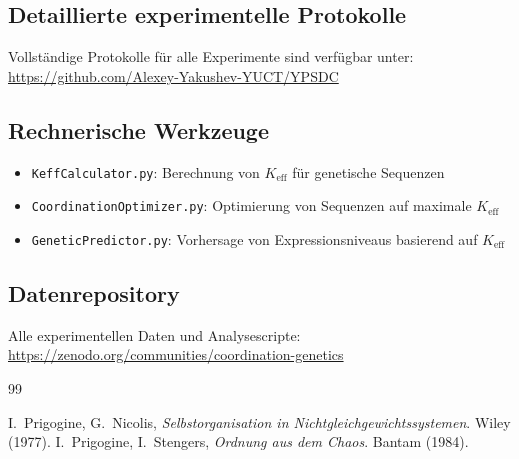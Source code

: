 \documentclass[12pt]{article}
\begin{document}
	\subsection{Detaillierte experimentelle Protokolle}
	
	Vollständige Protokolle für alle Experimente sind verfügbar unter:\\
	\url{https://github.com/Alexey-Yakushev-YUCT/YPSDC}
	
	\subsection{Rechnerische Werkzeuge}
	
	\begin{itemize}
		\item \texttt{KeffCalculator.py}: Berechnung von $K_{\text{eff}}$ für genetische Sequenzen
		\item \texttt{CoordinationOptimizer.py}: Optimierung von Sequenzen auf maximale $K_{\text{eff}}$
		\item \texttt{GeneticPredictor.py}: Vorhersage von Expressionsniveaus basierend auf $K_{\text{eff}}$
	\end{itemize}
	
	\subsection{Datenrepository}
	
	Alle experimentellen Daten und Analysescripte:\\
	\url{https://zenodo.org/communities/coordination-genetics}
	
	\begin{thebibliography}{99}
		
		 I.~Prigogine, G.~Nicolis, \emph{Selbstorganisation in Nichtgleichgewichtssystemen}. Wiley (1977).
		 I.~Prigogine, I.~Stengers, \emph{Ordnung aus dem Chaos}. Bantam (1984).
		
	\end{thebibliography}
	
\end{document}
